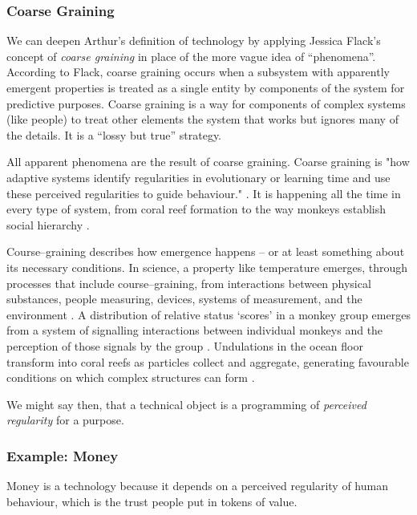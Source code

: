 \documentclass[letterpaper]{article}
\begin{document}
    \subsubsection{Coarse Graining}
    
    We can deepen Arthur's definition of technology by applying Jessica Flack's concept of \emph{coarse graining} in place of the more vague idea of “phenomena”. According to Flack, coarse graining occurs when a subsystem with apparently emergent properties is treated as a single entity by components of the system for predictive purposes. Coarse graining is a way for components of complex systems (like people) to treat other elements the system that works but ignores many of the details. It is a “lossy but true” \citep[p.4]{FlackCrsGrnng2017} strategy.
    
    All apparent phenomena are the result of coarse graining. Coarse graining is "how adaptive systems identify regularities in evolutionary or learning time and use these perceived regularities to guide behaviour." \citep[p.2]{FlackCrsGrnng2017}. It is happening all the time in every type of system, from coral reef formation \citep[p.61]{FlackEtAlTmsclsSymmtryUncrtnty2013} to the way monkeys establish social hierarchy \citep{FlackCntxtMdltsSgnlMnng2007}.

    
    Course–graining describes how emergence happens – or at least something about its necessary conditions. In science, a property like temperature emerges, through processes that include course–graining, from interactions between physical substances, people measuring, devices, systems of measurement, and the environment \citep[p.4]{FlackCrsGrnng2017}. A distribution of relative status ‘scores’ in a monkey group emerges from a system of signalling interactions between individual monkeys and the perception of those signals by the group \citep{FlackCntxtMdltsSgnlMnng2007}. Undulations in the ocean floor transform into coral reefs as particles collect and aggregate, generating favourable conditions on which complex structures can form \citep[p.61]{FlackEtAlTmsclsSymmtryUncrtnty2013}.
    
    We might say then, that a technical object is a programming of \emph{perceived regularity} for a purpose.

    \subsubsection{Example: Money}

    Money is a technology because it depends on a perceived regularity of human behaviour, which is the trust people put in tokens of value.
\end{document}
